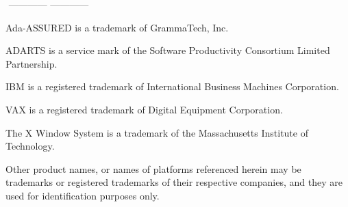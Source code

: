 ${}${}
\vfill
\noindent
------------ ------------

\footnotesize{
\noindent
Ada-ASSURED is a trademark of GrammaTech, Inc.

\noindent
ADARTS  is a service mark of the Software Productivity Consortium Limited Partnership.

\noindent
IBM is a registered trademark of International Business Machines Corporation.

\noindent
VAX is a registered trademark of Digital Equipment Corporation.

\noindent
The X Window System is a trademark of the Massachusetts Institute of Technology.

\noindent
Other product names, or names of platforms referenced herein may be trademarks or registered trademarks of their respective
companies, and they are used for identification purposes only.
}
